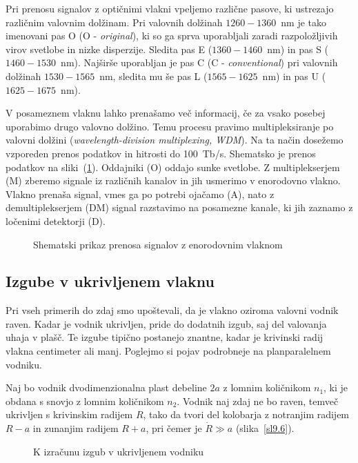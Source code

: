 \begin{remark}
Pri prenosu signalov z optičnimi vlakni vpeljemo različne pasove, ki ustrezajo 
različnim valovnim dolžinam. Pri valovnih dolžinah $1260-1360$~nm je tako imenovani
pas O (O - {\it original}), ki so ga sprva uporabljali zaradi razpoložljivih virov svetlobe
in nizke disperzije. Sledita pas E ($1360-1460$~nm) in pas S ($1460-1530$~nm). 
Najširše uporabljan je pas C (C - {\it conventional}) pri valovnih dolžinah $1530-1565$~nm,
sledita mu še pas L ($1565-1625$~nm) in pas U ($1625-1675$~nm).

V posameznem vlaknu lahko prenašamo več informacij, če za vsako posebej uporabimo
drugo valovno dolžino. Temu procesu pravimo multipleksiranje po valovni dolžini
({\it wavelength-division multiplexing, WDM}).
Na ta način dosežemo vzporeden prenos podatkov in hitrosti do 100~Tb/s.
Shematsko je prenos podatkov na sliki~(\ref{WDM}).
Oddajniki (O) oddajo sunke svetlobe. Z multiplekserjem (M) zberemo
signale iz različnih kanalov in jih usmerimo v enorodovno vlakno. Vlakno prenaša
signal, vmes ga po potrebi ojačamo (A), nato z demultiplekserjem (DM) signal razstavimo
na posamezne kanale, ki jih zaznamo z ločenimi detektorji (D).
\begin{figure}[h]
\centering
\def\svgwidth{120truemm} 
 
\caption{Shematski prikaz prenosa signalov z enorodovnim vlaknom}
\label{WDM}
\end{figure}
\end{remark}

\subsection*{Izgube v ukrivljenem vlaknu}
Pri vseh primerih do zdaj smo upoštevali, da je vlakno oziroma valovni 
vodnik raven. Kadar je vodnik ukrivljen, pride do dodatnih izgub, saj 
del valovanja uhaja v plašč. Te izgube tipično postanejo znantne, 
kadar je krivinski radij vlakna centimeter ali manj. Poglejmo si pojav podrobneje na
planparalelnem vodniku.

Naj bo vodnik dvodimenzionalna plast debeline $2a$ z lomnim količnikom
$n_{1}$, ki je obdana s snovjo z lomnim količnikom $n_{2}$. Vodnik naj
zdaj ne bo raven, temveč ukrivljen s krivinskim radijem $R$, tako da tvori 
del kolobarja z notranjim radijem $R-a$ in zunanjim radijem $R+a$, pri 
čemer je $\dot{R}\gg a$ (slika~\ref{sl9.6}). 
\begin{figure}[h]
\centering
\def\svgwidth{60truemm} 
% 
\caption{K izračunu izgub v ukrivljenem vodniku}
\label{fig:bend}
\end{figure}

